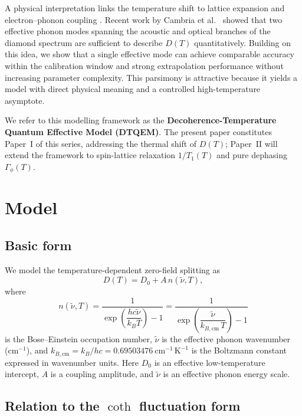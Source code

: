 \documentclass[12pt,a4paper]{article}
\begin{document}
A physical interpretation links the temperature shift to lattice expansion
and electron--phonon coupling \cite{Doherty2014}.
Recent work by Cambria et al.\ \cite{Cambria2024} showed that two effective
phonon modes spanning the acoustic and optical branches of the diamond
spectrum are sufficient to describe $D(T)$ quantitatively.
Building on this idea, we show that a single effective mode can achieve
comparable accuracy within the calibration window and strong extrapolation
performance without increasing parameter complexity.
This parsimony is attractive because it yields a model with direct physical
meaning and a controlled high-temperature asymptote.

We refer to this modelling framework as the
\textbf{Decoherence-Temperature Quantum Effective Model (DTQEM)}.
The present paper constitutes Paper~I of this series, addressing the
thermal shift of $D(T)$; Paper~II will extend the framework to
spin-lattice relaxation $1/T_1(T)$ and pure dephasing $\Gamma_\phi(T)$.

\section{Model}

\subsection{Basic form}

We model the temperature-dependent zero-field splitting as
%
\begin{equation}
    D(T) = D_0 + A\,n(\tilde{\nu}, T),
    \label{eq:model}
\end{equation}
%
where
%
\begin{equation}
    n(\tilde{\nu}, T) =
    \frac{1}{\exp\!\left(\dfrac{hc\tilde{\nu}}{k_B T}\right) - 1}
    =
    \frac{1}{\exp\!\left(\dfrac{\tilde{\nu}}{k_{B,\mathrm{cm}}\,T}\right) - 1}
    \label{eq:BE}
\end{equation}
%
is the Bose--Einstein occupation number, $\tilde{\nu}$ is the effective
phonon wavenumber (cm$^{-1}$), and
$k_{B,\mathrm{cm}} = k_B/hc = 0.69503476\ \mathrm{cm}^{-1}\,\mathrm{K}^{-1}$
is the Boltzmann constant expressed in wavenumber units.
Here $D_0$ is an effective low-temperature intercept, $A$ is a coupling
amplitude, and $\tilde{\nu}$ is an effective phonon energy scale.

\subsection{Relation to the \texorpdfstring{$\coth$}{coth} fluctuation form}
\end{document}
